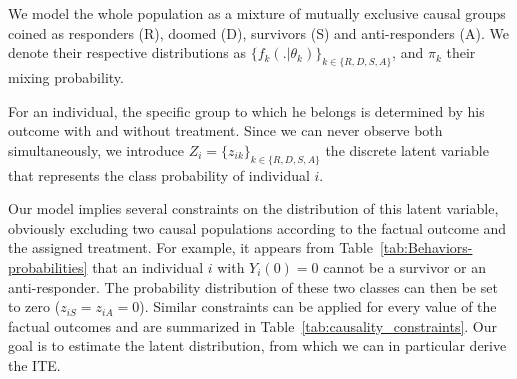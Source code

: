We model the whole population as a mixture of mutually exclusive causal groups coined as responders (R), doomed (D), survivors (S) and anti-responders (A). We denote their respective distributions as 
$\{f_k(. | \theta_k) \}_{k \in \{R,D,S,A\}}$, and $\pi_k$ their mixing probability.

For an individual, the specific group to which he belongs is determined by his outcome with and without treatment. Since we can never observe both simultaneously, we introduce $Z_i=\{z_{ik}\}_{k \in \{R,D,S,A\}}$ the discrete latent variable that represents the class probability of individual $i$. %


%
Our model implies several constraints on the distribution of this latent variable, obviously excluding two causal populations according to the factual outcome and the assigned treatment. For example, it appears from Table~\ref{tab:Behaviors-probabilities} that an individual $i$ with $Y_i(0)=0$ cannot be a survivor or an anti-responder. The probability distribution of these two classes can then be set to zero ($z_{iS}=z_{iA}=0$). Similar constraints can be applied for every value of the factual outcomes and are summarized in Table~\ref{tab:causality_constraints}. Our goal is to estimate the latent distribution, from which we can in particular derive the ITE.



